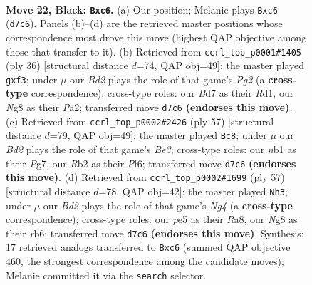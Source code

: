 \documentclass[11pt]{article}
\begin{document}
\clearpage

\begin{figure}[p]\centering
\begin{subfigure}{0.46\textwidth}\centering
\resizebox{\linewidth}{!}{%
\newchessgame
\chessboard[
  setfen={4k1nr/3b1ppp/2B5/4P2P/P7/5NK1/1r4P1/RN5R b k - 0 22},
  showmover=false,
  pgfstyle=straightmove, color=movearrow, markmove={d7-c6}
]}
\caption{}
\end{subfigure}\hfill
\begin{subfigure}{0.46\textwidth}\centering
\resizebox{\linewidth}{!}{%
\newchessgame
\chessboard[
  setfen={rn3r2/p3Rppk/1p6/8/2p2B2/2P2b2/P4PPP/2KR4 w - - 0 19},
  showmover=false,
  pgfstyle=straightmove, color=movearrow, markmove={g2-f3}
]}
\caption{}
\end{subfigure}
\\[4pt]
\begin{subfigure}{0.46\textwidth}\centering
\resizebox{\linewidth}{!}{%
\newchessgame
\chessboard[
  setfen={6k1/6pp/4bp2/1R3P2/2n5/2r1NP2/4PK1P/2B5 b - - 0 29},
  showmover=false,
  pgfstyle=straightmove, color=movearrow, markmove={e6-c8}
]}
\caption{}
\end{subfigure}\hfill
\begin{subfigure}{0.46\textwidth}\centering
\resizebox{\linewidth}{!}{%
\newchessgame
\chessboard[
  setfen={r3r3/6pk/1R3b1p/4NpnP/3P1B2/8/PP6/1K1R4 b - - 2 29},
  showmover=false,
  pgfstyle=straightmove, color=movearrow, markmove={g5-h3}
]}
\caption{}
\end{subfigure}
\caption{\textbf{Move 22, Black: \texttt{Bxc6}.} (a) Our position; Melanie plays \texttt{Bxc6} (\texttt{d7c6}). Panels (b)--(d) are the retrieved master positions whose correspondence most drove this move (highest QAP objective among those that transfer to it). (b) Retrieved from \texttt{ccrl\_top\_p0001\#1405} (ply 36) [structural distance $d$=74, QAP obj=49]: the master played \texttt{gxf3}; under $\mu$ our \emph{Bd2} plays the role of that game's \emph{Pg2} (a \textbf{cross-type} correspondence); cross-type roles: our \emph{B}d7 as their \emph{R}d1, our \emph{N}g8 as their \emph{P}a2; transferred move \texttt{d7c6} \textbf{(endorses this move)}. (c) Retrieved from \texttt{ccrl\_top\_p0002\#2426} (ply 57) [structural distance $d$=79, QAP obj=49]: the master played \texttt{Bc8}; under $\mu$ our \emph{Bd2} plays the role of that game's \emph{Be3}; cross-type roles: our \emph{n}b1 as their \emph{P}g7, our \emph{R}b2 as their \emph{P}f6; transferred move \texttt{d7c6} \textbf{(endorses this move)}. (d) Retrieved from \texttt{ccrl\_top\_p0002\#1699} (ply 57) [structural distance $d$=78, QAP obj=42]: the master played \texttt{Nh3}; under $\mu$ our \emph{Bd2} plays the role of that game's \emph{Ng4} (a \textbf{cross-type} correspondence); cross-type roles: our \emph{p}e5 as their \emph{R}a8, our \emph{N}g8 as their \emph{r}b6; transferred move \texttt{d7c6} \textbf{(endorses this move)}. Synthesis: 17 retrieved analogs transferred to \texttt{Bxc6} (summed QAP objective 460, the strongest correspondence among the candidate moves); Melanie committed it via the \texttt{search} selector.}
\label{fig:thought-m43}
\end{figure}
\end{document}
